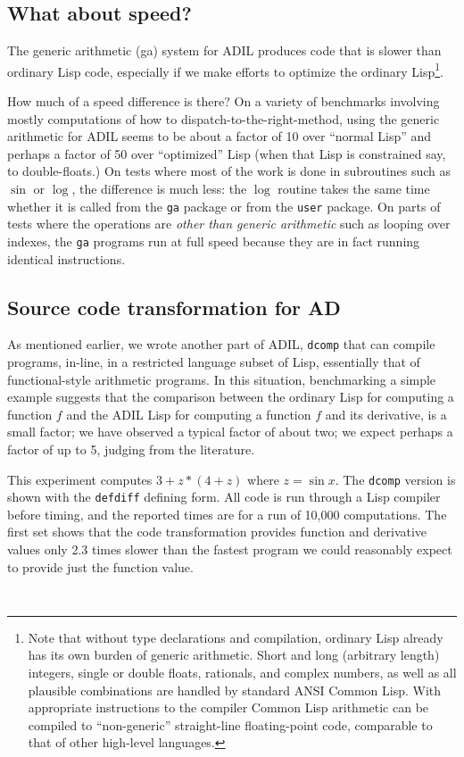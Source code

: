 \documentclass{article}
\begin{document}
{{{\subsection{What about speed?}
The generic arithmetic (ga) system for ADIL
produces code that is slower than ordinary Lisp code,
especially if we make efforts to optimize 
the ordinary Lisp\footnote{ Note that without
type declarations and compilation, ordinary Lisp already has its own
burden of generic arithmetic.  Short and long (arbitrary length)
integers, single or double floats, rationals, and complex numbers, as
well as all plausible combinations are handled by standard ANSI Common
Lisp. With appropriate instructions to the compiler
Common Lisp arithmetic can be compiled to ``non-generic'' straight-line
floating-point code, comparable to that of other high-level languages.
}.

How much of a speed difference is there?
On a variety of benchmarks involving mostly computations of how to
dispatch-to-the-right-method, using the generic arithmetic for ADIL
seems to be about a factor of 10 over ``normal Lisp'' and perhaps a
factor of 50 over ``optimized'' Lisp (when that Lisp is constrained say,
to double-floats.)
On tests where most of the work is done in subroutines such as
$\sin$ or $\log$, the difference is much less:  the $\log$ routine
takes the same time whether it is called from the {\tt ga} package
or from the {\tt user} package. On parts of tests where the operations
are {\em other than generic arithmetic} such as looping over indexes,
the {\tt ga} programs run at full speed because they are in fact
running identical instructions.

\subsection{Source code transformation for AD}

As mentioned earlier, we wrote another part of ADIL, {\tt dcomp} that
can compile programs, in-line, in a restricted language subset of
Lisp, essentially that of functional-style arithmetic programs.  In
this situation, benchmarking a simple example suggests that the
comparison between the ordinary Lisp for computing a function $f$ and
the ADIL Lisp for computing a function $f$ and its derivative, is
a small factor; we have observed
a typical factor of about two; we expect perhaps a factor of up to 5, judging
from the literature.

This experiment computes $3+z*(4+z)$ where $z=\sin x$. 
The {\tt dcomp}
version is shown with the {\tt defdiff} defining form.
All code is run through a Lisp compiler before timing, and the
reported times are for a run of 10,000 computations.
The first set shows that the code transformation provides function
and derivative values only 2.3 times slower than 
the fastest program we could reasonably expect to provide just the
function value.
\begin{verbatim}


\end{verbatim}}}}
\end{document}
